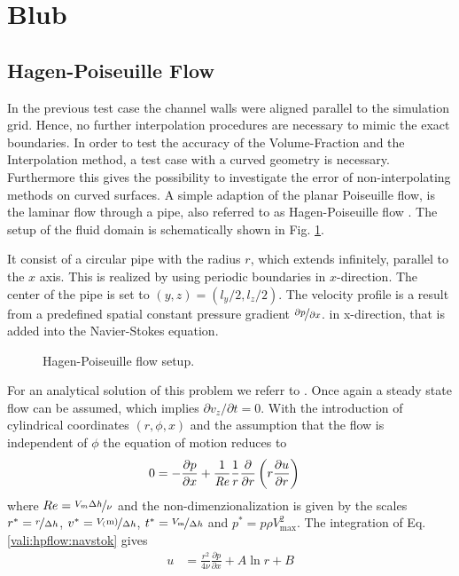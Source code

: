 \section{Blub}
\subsection{Hagen-Poiseuille Flow}

In the previous test case the channel walls were aligned parallel to the simulation grid. Hence, no further interpolation procedures
are necessary to mimic the exact boundaries.
In order to test the accuracy of the Volume-Fraction and the Interpolation method, a test case with a curved geometry is necessary.
Furthermore this gives the possibility to investigate the error of non-interpolating methods on curved surfaces.
A simple adaption of the planar Poiseuille flow, is the laminar flow through a pipe, also referred to as Hagen-Poiseuille flow \citep{tritton88}.
The setup of the fluid domain is schematically shown in Fig. \ref{validation:setup_hpflow}.

It consist of a circular pipe with the radius $r$, which extends infinitely, parallel to the $x$ axis.
This is realized by using periodic boundaries in $x$-direction.
The center of the pipe is set to $(y, z) = (l_y/2, l_z/2)$.
The velocity profile is a result from a predefined spatial constant pressure gradient $\nicefrac{\partial p}{\partial x}$.
in x-direction, that is added into the Navier-Stokes equation.


\begin{figure}[!bp]
      \centering
      \caption{Hagen-Poiseuille flow setup.
                \label{validation:setup_hpflow}
      }
\end{figure}

For an analytical solution of this problem we referr to \citep{Kundu2012}.
Once again a steady state flow can be assumed, which implies $\partial v_z/\partial t = 0$. With the introduction of cylindrical coordinates $(r, \phi, x)$
and the assumption that the flow is independent of $\phi$ the equation of motion reduces to
\begin{align}
    \label{vali:hpflow:navstok}
        0 &= - \frac{\partial p}{\partial x}  +  \frac{1}{\mbox{\textit{Re}}} \frac{1}{r}\frac{\partial}{\partial r}\left(r\frac{\partial u}{\partial r}\right)
\end{align}
where $Re = \nicefrac{V_{m}\Delta h}{\nu}$
and the non-dimenzionalization is given by the scales
    $r^* = \nicefrac{r}{\Delta h}$, $v^*=\nicefrac{V_(\text{m})}{\Delta h}$,
    $t^* = \nicefrac{V_{\text{m}}}{\Delta h}$ and $p^* = p \rho V_{\text{max}}^2$.
The integration of Eq. \ref{vali:hpflow:navstok} gives
\begin{align}
    u &= \frac{r^2}{4\nu}\frac{\partial p}{\partial x} + A \ln r + B
\end{align}

